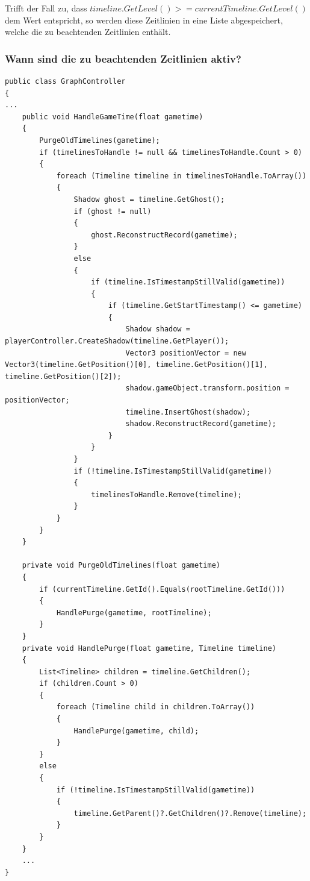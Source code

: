 Trifft der Fall zu, dass $timeline.GetLevel() >= currentTimeline.GetLevel()$ dem Wert  entspricht, so werden diese Zeitlinien in eine Liste abgespeichert, welche die zu beachtenden Zeitlinien enthält.

\subsubsection{Wann sind die zu beachtenden Zeitlinien aktiv?}\label{sec:good_03}
\begin{lstlisting}[caption={Haupt Gameloop der Mechanik aus dem Gamedesign Workshop}, label={sec:handleGameTime_old}]
public class GraphController
{
...
    public void HandleGameTime(float gametime)
    {
        PurgeOldTimelines(gametime);
        if (timelinesToHandle != null && timelinesToHandle.Count > 0)
        {
            foreach (Timeline timeline in timelinesToHandle.ToArray())
            {
                Shadow ghost = timeline.GetGhost();
                if (ghost != null)
                {
                    ghost.ReconstructRecord(gametime);
                }
                else
                {
                    if (timeline.IsTimestampStillValid(gametime))
                    {
                        if (timeline.GetStartTimestamp() <= gametime)
                        {
                            Shadow shadow = playerController.CreateShadow(timeline.GetPlayer());
                            Vector3 positionVector = new Vector3(timeline.GetPosition()[0], timeline.GetPosition()[1], timeline.GetPosition()[2]);
                            shadow.gameObject.transform.position = positionVector;
                            timeline.InsertGhost(shadow);
                            shadow.ReconstructRecord(gametime);
                        }
                    }
                }
                if (!timeline.IsTimestampStillValid(gametime))
                {
                    timelinesToHandle.Remove(timeline);
                }
            }
        }
    }

    private void PurgeOldTimelines(float gametime)
    {
        if (currentTimeline.GetId().Equals(rootTimeline.GetId()))
        {
            HandlePurge(gametime, rootTimeline);
        }
    }
    private void HandlePurge(float gametime, Timeline timeline)
    {
        List<Timeline> children = timeline.GetChildren();
        if (children.Count > 0)
        {
            foreach (Timeline child in children.ToArray())
            {
                HandlePurge(gametime, child);
            }
        }
        else
        {
            if (!timeline.IsTimestampStillValid(gametime))
            {
                timeline.GetParent()?.GetChildren()?.Remove(timeline);
            }
        }
    }
    ...
}
\end{lstlisting}

